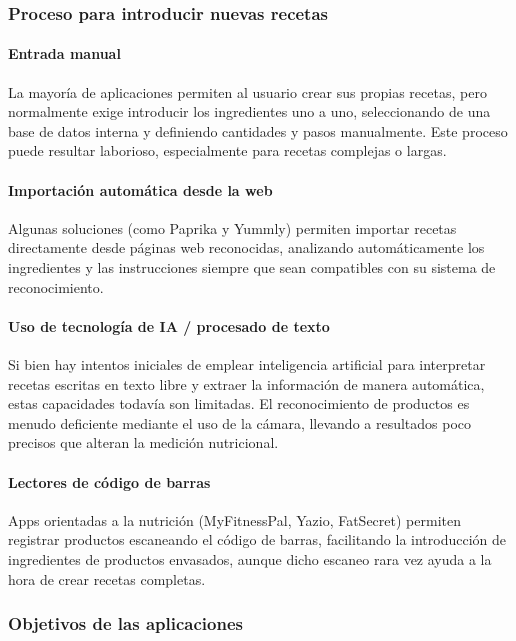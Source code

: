 \subsubsection*{Proceso para introducir nuevas recetas}

\paragraph*{Entrada manual}
La mayoría de aplicaciones permiten al usuario crear sus propias recetas, pero normalmente exige introducir los ingredientes uno a uno, seleccionando de una base de datos interna y definiendo cantidades y pasos manualmente. Este proceso puede resultar laborioso, especialmente para recetas complejas o largas.

\paragraph*{Importación automática desde la web}
Algunas soluciones (como Paprika y Yummly) permiten importar recetas directamente desde páginas web reconocidas, analizando automáticamente los ingredientes y las instrucciones siempre que sean compatibles con su sistema de reconocimiento.

\paragraph*{Uso de tecnología de IA / procesado de texto}
Si bien hay intentos iniciales de emplear inteligencia artificial para interpretar recetas escritas en texto libre y extraer la información de manera automática, estas capacidades todavía son limitadas. El reconocimiento de productos es menudo deficiente mediante el uso de la cámara, llevando a resultados poco precisos que alteran la medición nutricional.

\paragraph*{Lectores de código de barras}
Apps orientadas a la nutrición (MyFitnessPal, Yazio, FatSecret) permiten registrar productos escaneando el código de barras, facilitando la introducción de ingredientes de productos envasados, aunque dicho escaneo rara vez ayuda a la hora de crear recetas completas.

\subsubsection*{Objetivos de las aplicaciones}

